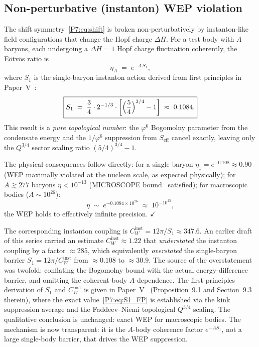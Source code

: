 \documentclass[11pt,a4paper]{article}
\theoremstyle{definition}
\theoremstyle{remark}
\newcommand{\vp}{\varphi}
\begin{document}
\subsection{Non-perturbative (instanton) WEP violation}

The shift symmetry~\eqref{P7:eq:shift} is broken non-perturbatively by
instanton-like field configurations that change the Hopf charge $\Delta H$.
For a test body with $A$ baryons, each undergoing a $\Delta H=1$
Hopf charge fluctuation coherently, the E\"{o}tv\"{o}s ratio is
\begin{equation}
  \eta_A \;=\; e^{-A\,S_1},
  \label{P7:eq:eta_A}
\end{equation}
where $S_1$ is the single-baryon instanton action derived from first
principles in Paper~V~\cite{Paper5}:
\begin{equation}
  \boxed{S_1
  \;=\; \frac{3}{4}\cdot 2^{-1/3}
        \cdot\left[\Bigl(\frac{5}{4}\Bigr)^{3/4}-1\right]
  \;\approx\; 0.1084.}
  \label{P7:eq:S1_FP}
\end{equation}
This result is a \emph{pure topological number}: the $\vp^6$ Bogomolny
parameter from the condensate energy and the $1/\vp^6$ suppression from
$S_{\mathrm{eff}}$ cancel exactly, leaving only the $Q^{3/4}$ sector
scaling ratio $(5/4)^{3/4}-1$.

The physical consequences follow directly:
for a single baryon $\eta_1 = e^{-0.108}\approx0.90$
(WEP maximally violated at the nucleon scale, as expected physically);
for $A\gtrsim277$ baryons $\eta<10^{-13}$ (MICROSCOPE bound~\cite{MICROSCOPE2022} satisfied);
for macroscopic bodies ($A\sim10^{26}$):
\begin{equation}
  \eta \;\sim\; e^{-0.1084\times10^{26}} \;\approx\; 10^{-10^{25}},
  \label{P7:eq:eta_macro}
\end{equation}
the WEP holds to effectively infinite precision. $\checkmark$

The corresponding instanton coupling is
$C_W^{\mathrm{inst}} = 12\pi/S_1\approx347.6$.
An earlier draft of this series carried an estimate $C_W^{\mathrm{inst}}\approx1.22$
that \emph{understated} the instanton coupling by a factor $\approx285$,
which equivalently \emph{overstated} the single-baryon barrier
$S_1 = 12\pi/C_W^{\mathrm{inst}}$ from $\approx0.108$ to $\approx30.9$.
The source of the overstatement was twofold: conflating the Bogomolny
bound with the actual energy-difference barrier, and omitting the
coherent-body $A$-dependence.
The first-principles derivation of $S_1$ and $C_W^{\mathrm{inst}}$ is given
in Paper~V~\cite{Paper5} (Proposition~9.1 and Section~9.3 therein),
where the exact value~\eqref{P7:eq:S1_FP} is established via the kink
suppression average and the Faddeev--Niemi topological $Q^{3/4}$ scaling.
The qualitative conclusion is unchanged: exact WEP for macroscopic bodies.
The mechanism is now transparent: it is the $A$-body coherence
factor $e^{-AS_1}$, not a large single-body barrier, that drives the
WEP suppression.
\end{document}
